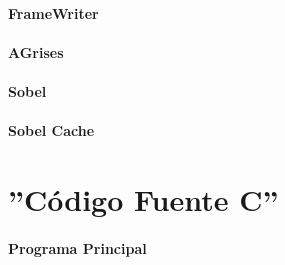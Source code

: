 \documentclass[a4paper,12pt,titlepage,final]{book}
\begin{document}
\subsubsection{FrameWriter}

\subsubsection{AGrises}

\subsubsection{Sobel}

\subsubsection{Sobel Cache}


\chapter{''Código Fuente C''}
\subsubsection{Programa Principal}
\lstset{
language=c
}


\backmatter



\end{document}
